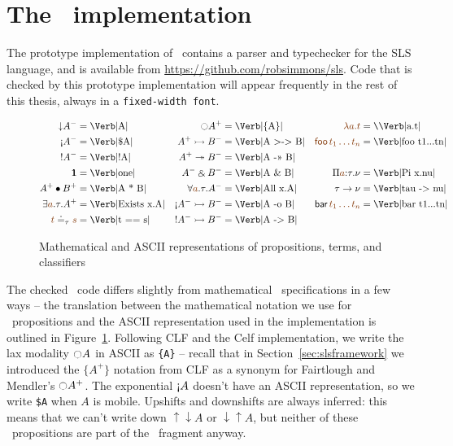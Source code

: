 \section{The \sls~implementation}
\label{sec:prototype}

The prototype implementation of \sls~contains a parser and typechecker
for the SLS language, and is available from
\url{https://github.com/robsimmons/sls}. Code that is checked by this
prototype implementation will appear frequently in the rest of this
thesis, always in a \verb|fixed-width font|.

\begin{figure}
\newcommand{\thingamajig}{=}
\begin{align*}
{\downarrow}A^- & \thingamajig \mbox{\Verb|A|} 
 & {\ocircle}A^+ & \thingamajig \mbox{\Verb|\{A\}|}
 & \lf{\lambda a.t} & \thingamajig \mbox{{\texttt{\char`\\}}\Verb|a.t|}
\\
{\gnab}A^- & \thingamajig \mbox{\Verb|\$A|}
 & A^+ \lefti B^- & \thingamajig \mbox{\Verb|A >-> B|}
 & \lf{{\sf foo}\,t_1\ldots t_n} & \thingamajig \mbox{\Verb|foo t1...tn|}
\\
{!}A^- & \thingamajig \mbox{\Verb|!A|}
 & A^+ \righti B^- & \thingamajig \mbox{\Verb|A ->> B|}
\\
\one & \thingamajig \mbox{\Verb|one|}
 & A^- \with B^- & \thingamajig \mbox{\Verb|A \& B|}
 & \Pi\lf{a}{:}\tau.\nu & \thingamajig \mbox{\Verb|Pi x.nu|}
\\
A^+ \fuse B^+ & \thingamajig \mbox{\Verb|A * B|}
 & \forall \lf{a}.\tau. A^- & \thingamajig \mbox{\Verb|All x.A|}
 & \tau \rightarrow \nu & \thingamajig{\mbox{\Verb|tau -> nu|}}
\\
\exists \lf{a}.\tau. A^+ & \thingamajig \mbox{\Verb|Exists x.A|}
 & {\gnab}A^- \lefti B^- & \thingamajig \mbox{\Verb|A -o B|}
 & {\sf bar}\,\lf{t_1 \ldots t_n} & \thingamajig{\mbox{\Verb|bar t1...tn|}}
\\
\lf{t} \doteq_\tau \lf{s} & \thingamajig \mbox{\Verb|t == s|}
 & {!}A^- \lefti B^- & \thingamajig \mbox{\Verb|A -> B|}
\end{align*}
\caption{Mathematical and ASCII representations of propositions,
  terms, and classifiers}
\label{fig:translate-types}
\end{figure}


The checked \sls~code differs slightly from mathematical
\sls~specifications in a few ways -- the translation between the
mathematical notation we use for \sls~propositions and the ASCII
representation used in the implementation is outlined in
Figure~\ref{fig:translate-types}.  Following CLF and the Celf
implementation, we write the lax modality ${\ocircle}A$ in ASCII as
\verb|{A}| -- recall that in Section~\ref{sec:slsframework} we
introduced the $\{ A^+ \}$ notation from CLF as a synonym for
Fairtlough and Mendler's ${\ocircle}A^+$.  The exponential ${\gnab}A$
doesn't have an ASCII representation, so we write \verb|$A| when $A$
is mobile. Upshifts and downshifts are always inferred: this means
that we can't write down ${\uparrow}{\downarrow}A$ or
${\downarrow}{\uparrow}A$, but neither of these \ollll~propositions
are part of the \sls~fragment anyway.

